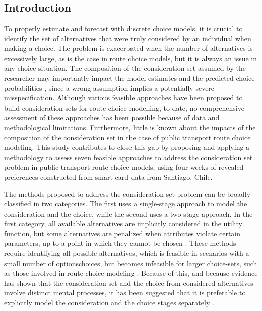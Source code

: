 \documentclass[12pt,a4paper]{article}
\begin{document}
\chapter{}\label{c3}


\section{Introduction}

To properly estimate and forecast with discrete choice models, it is crucial to identify the set of alternatives that were truly considered by an individual when making a choice. The problem is exacerbated when the number of alternatives is excessively large, as is the case in route choice models, but it is always an issue in any choice situation. The composition of the consideration set assumed by the researcher may importantly impact the model estimates and the predicted choice probabilities \citep{bliemer2008impact,prato2007modeling}, since a wrong assumption implies a potentially severe misspecification. Although  various feasible approaches have been proposed to build consideration sets for route choice modelling, to date, no comprehensive assessment of these approaches has been possible because of data and methodological limitations. Furthermore, little is known about the impacts of the composition of the consideration set in the case of public transport route choice modeling. This study contributes to close this gap by proposing and applying a methodology to assess seven feasible approaches to address the consideration set problem in public transport route choice models, using four weeks of revealed preferences constructed from smart card data from Santiago, Chile.

The methods proposed to address the consideration set problem can be broadly classified in two categories. The first uses a single-stage approach to model the consideration and the choice, while the second uses a two-stage approach. In the first category, all available alternatives are implicitly considered in the utility function, but some alternatives are penalized when attributes violate certain parameters, up to a point in which they cannot be chosen \citep{castro2013estimation, martinez2009constrained}. These methods require identifying all possible alternatives, which is feasible in scenarios with a small number of optionschoices, but becomes infeasible for larger choice-sets, such as those involved in route choice modeling . Because of this, and because evidence has shown that the consideration set and the choice from considered alternatives involve distinct mental processes, it has been suggested that it is preferable to explicitly model the consideration and the choice stages separately \citep{prato2009route}.
\end{document}
